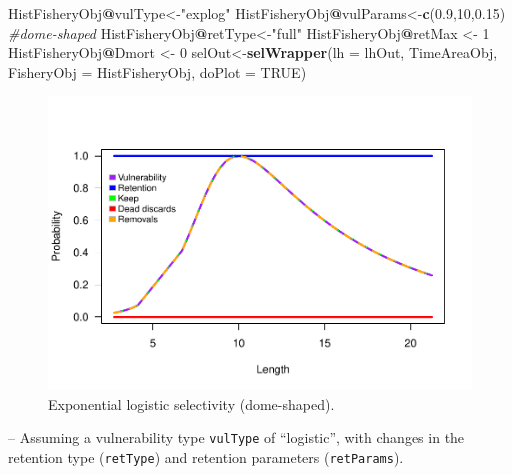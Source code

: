\documentclass[
]{book}
\newenvironment{Shaded}{\begin{snugshade}}{\end{snugshade}}
\newcommand{\AttributeTok}[1]{\textcolor[rgb]{0.13,0.29,0.53}{#1}}
\newcommand{\CommentTok}[1]{\textcolor[rgb]{0.56,0.35,0.01}{\textit{#1}}}
\newcommand{\ConstantTok}[1]{\textcolor[rgb]{0.56,0.35,0.01}{#1}}
\newcommand{\DecValTok}[1]{\textcolor[rgb]{0.00,0.00,0.81}{#1}}
\newcommand{\FloatTok}[1]{\textcolor[rgb]{0.00,0.00,0.81}{#1}}
\newcommand{\FunctionTok}[1]{\textcolor[rgb]{0.13,0.29,0.53}{\textbf{#1}}}
\newcommand{\NormalTok}[1]{#1}
\newcommand{\OtherTok}[1]{\textcolor[rgb]{0.56,0.35,0.01}{#1}}
\newcommand{\SpecialCharTok}[1]{\textcolor[rgb]{0.81,0.36,0.00}{\textbf{#1}}}
\newcommand{\StringTok}[1]{\textcolor[rgb]{0.31,0.60,0.02}{#1}}
\begin{document}
\begin{Shaded}
\begin{Highlighting}[]
\NormalTok{HistFisheryObj}\SpecialCharTok{@}\NormalTok{vulType}\OtherTok{\textless{}{-}}\StringTok{"explog"}
\NormalTok{HistFisheryObj}\SpecialCharTok{@}\NormalTok{vulParams}\OtherTok{\textless{}{-}}\FunctionTok{c}\NormalTok{(}\FloatTok{0.9}\NormalTok{,}\DecValTok{10}\NormalTok{,}\FloatTok{0.15}\NormalTok{) }\CommentTok{\#dome{-}shaped}
\NormalTok{HistFisheryObj}\SpecialCharTok{@}\NormalTok{retType}\OtherTok{\textless{}{-}}\StringTok{"full"}
\NormalTok{HistFisheryObj}\SpecialCharTok{@}\NormalTok{retMax }\OtherTok{\textless{}{-}} \DecValTok{1}
\NormalTok{HistFisheryObj}\SpecialCharTok{@}\NormalTok{Dmort }\OtherTok{\textless{}{-}} \DecValTok{0}
\NormalTok{selOut}\OtherTok{\textless{}{-}}\FunctionTok{selWrapper}\NormalTok{(}\AttributeTok{lh =}\NormalTok{ lhOut, TimeAreaObj, }\AttributeTok{FisheryObj =}\NormalTok{ HistFisheryObj, }\AttributeTok{doPlot =} \ConstantTok{TRUE}\NormalTok{)}
\end{Highlighting}
\end{Shaded}

\begin{figure}
\centering
\includegraphics{_main_files/figure-latex/sel2-1.pdf}
\caption{\label{fig:sel2}Exponential logistic selectivity (dome-shaped).}
\end{figure}

-- Assuming a vulnerability type \texttt{vulType} of ``logistic'', with changes in the retention type (\texttt{retType}) and retention parameters (\texttt{retParams}).
\end{document}
